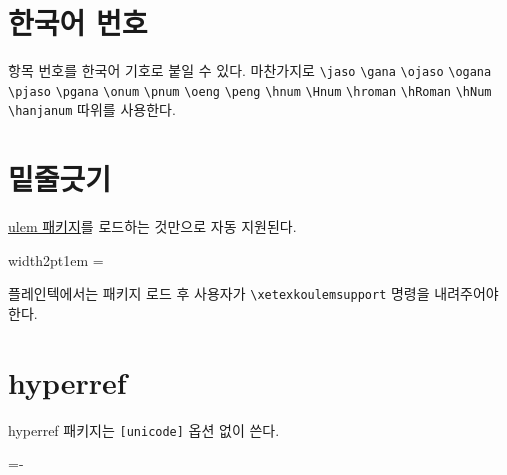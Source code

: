 \documentclass[a4paper]{article}
\def\logoko{\textsf{k}\kern-.1em\textit{o}}
\def\kotex{\logoko\kern-.1ex .\kern-.1667em \TeX}
\def\grayvrule{\color{white!80!black}\vrule width2pt\color{black}}
\newenvironment{plaintex}
  {\par\medskip\leavevmode\hbox\bgroup\grayvrule\kern1em
    \vbox\bgroup\hsize=\dimexpr\textwidth-12pt\relax\small
  }{\egroup\egroup\par\medskip}
\begin{document}
\section{한국어 번호}
항목 번호를 한국어 기호로 붙일 수 있다.  마찬가지로
\verb|\jaso| \verb|\gana| \verb|\ojaso| \verb|\ogana| \verb|\pjaso|
\verb|\pgana| \verb|\onum| \verb|\pnum| \verb|\oeng| \verb|\peng|
\verb|\hnum| \verb|\Hnum| \verb|\hroman| \verb|\hRoman| \verb|\hNum|
\verb|\hanjanum|
따위를 사용한다.

\section{밑줄긋기}
 \uline{ulem 패키지}를 로드하는 것만으로 자동 지원된다.
\begin{plaintex}
플레인텍에서는 패키지 로드 후 사용자가 \verb|\xetexkoulemsupport|
명령을 내려주어야 한다.
\end{plaintex}

\section{hyperref}
hyperref 패키지는 \verb+[unicode]+ 옵션 없이 쓴다.

\begin{flushright}
  \fboxsep=-\fboxrule
\end{flushright}
\end{document}
